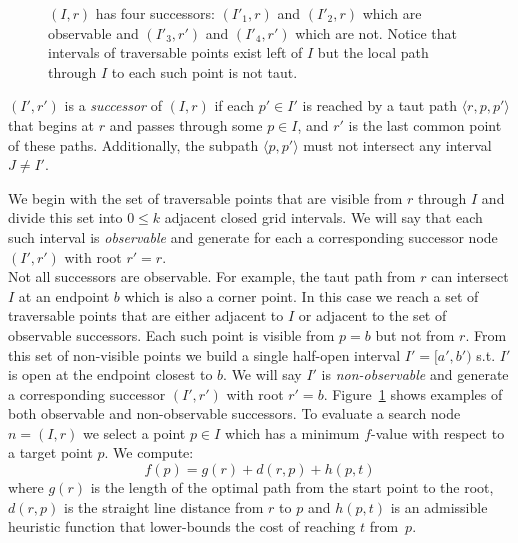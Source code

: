 \begin{figure}[tb]
  \begin{center}
    
  \end{center}
	\vspace{-1em}
  \caption{$(I, r)$ has four successors: $(I'_1, r)$ and $(I'_2,r)$ which are observable and $(I'_3, r')$ and $(I'_4, r')$ which are not. Notice that intervals of traversable points exist left of $I$ but the local path through $I$ to each such point is not taut.}
\label{fig::successors}
\vspace{-0.5em}
\end{figure}

\begin{defi}
\label{defi::successors}
$(I', r')$ is a \emph{successor} of
$(I, r)$ if each $p' \in I'$ is reached
by a taut path $\langle r, p,  p' \rangle$ that begins
at $r$ and passes through some $p \in I$, 
and $r'$ is the last common point of these paths.  Additionally, 
the subpath $\langle p, p' \rangle$ must not intersect any 
interval $J \neq I'$.
\end{defi}
We begin with the set of traversable points that are 
visible from $r$ through $I$ and divide this set into $0 \leq k$
adjacent closed grid intervals.
We will say that each such interval is \emph{observable} and 
generate for each a corresponding successor node 
$(I', r')$ with root $r' = r$.
\\
Not all successors are observable.
For example, the taut path from $r$ can intersect 
$I$ at an endpoint $b$ which is also a corner point.
In this case we reach a set of traversable points that 
are either adjacent to $I$ or adjacent to the set of 
observable successors.
Each such point is visible from $p = b$ but not 
from $r$.  From this set of non-visible points we build a 
single half-open interval $I' = [a', b')$ s.t. $I'$ is open at the 
endpoint closest to $b$.
We will say $I'$ is \emph{non-observable} and generate a 
corresponding successor $(I', r')$ with root $r' = b$.  
Figure~\ref{fig::successors} shows examples of both
observable and non-observable successors.
%
To evaluate a search node $n = (I, r)$ we select a point $p \in I$ 
which has a minimum $f$-value with respect to a target point $p$. We compute:
\begin{equation}
\label{eq::f}
f(p) = g(r) + d(r, p) + h(p, t)
\end{equation}
where $g(r)$ is the length of the optimal path from the start point to 
the root, $d(r, p)$ is the straight line distance from $r$ to $p$
and $h(p, t)$ is an admissible heuristic function that lower-bounds the cost of reaching $t$ from~$p$.  

